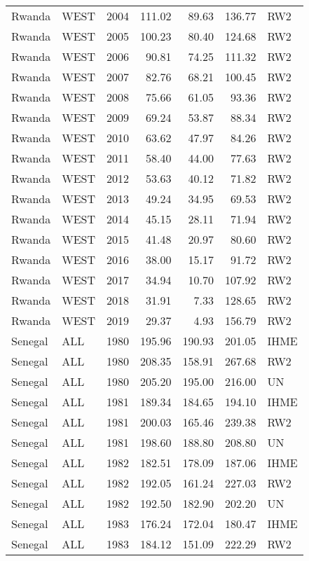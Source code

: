 \begin{longtable}{lllrrrl}
  Rwanda & WEST & 2004 & 111.02 & 89.63 & 136.77 & RW2 \\ 
  Rwanda & WEST & 2005 & 100.23 & 80.40 & 124.68 & RW2 \\ 
  Rwanda & WEST & 2006 & 90.81 & 74.25 & 111.32 & RW2 \\ 
  Rwanda & WEST & 2007 & 82.76 & 68.21 & 100.45 & RW2 \\ 
  Rwanda & WEST & 2008 & 75.66 & 61.05 & 93.36 & RW2 \\ 
  Rwanda & WEST & 2009 & 69.24 & 53.87 & 88.34 & RW2 \\ 
  Rwanda & WEST & 2010 & 63.62 & 47.97 & 84.26 & RW2 \\ 
  Rwanda & WEST & 2011 & 58.40 & 44.00 & 77.63 & RW2 \\ 
  Rwanda & WEST & 2012 & 53.63 & 40.12 & 71.82 & RW2 \\ 
  Rwanda & WEST & 2013 & 49.24 & 34.95 & 69.53 & RW2 \\ 
  Rwanda & WEST & 2014 & 45.15 & 28.11 & 71.94 & RW2 \\ 
  Rwanda & WEST & 2015 & 41.48 & 20.97 & 80.60 & RW2 \\ 
  Rwanda & WEST & 2016 & 38.00 & 15.17 & 91.72 & RW2 \\ 
  Rwanda & WEST & 2017 & 34.94 & 10.70 & 107.92 & RW2 \\ 
  Rwanda & WEST & 2018 & 31.91 & 7.33 & 128.65 & RW2 \\ 
  Rwanda & WEST & 2019 & 29.37 & 4.93 & 156.79 & RW2 \\ 
  Senegal & ALL & 1980 & 195.96 & 190.93 & 201.05 & IHME \\ 
  Senegal & ALL & 1980 & 208.35 & 158.91 & 267.68 & RW2 \\ 
  Senegal & ALL & 1980 & 205.20 & 195.00 & 216.00 & UN \\ 
  Senegal & ALL & 1981 & 189.34 & 184.65 & 194.10 & IHME \\ 
  Senegal & ALL & 1981 & 200.03 & 165.46 & 239.38 & RW2 \\ 
  Senegal & ALL & 1981 & 198.60 & 188.80 & 208.80 & UN \\ 
  Senegal & ALL & 1982 & 182.51 & 178.09 & 187.06 & IHME \\ 
  Senegal & ALL & 1982 & 192.05 & 161.24 & 227.03 & RW2 \\ 
  Senegal & ALL & 1982 & 192.50 & 182.90 & 202.20 & UN \\ 
  Senegal & ALL & 1983 & 176.24 & 172.04 & 180.47 & IHME \\ 
  Senegal & ALL & 1983 & 184.12 & 151.09 & 222.29 & RW2 \\ 

\end{longtable}
